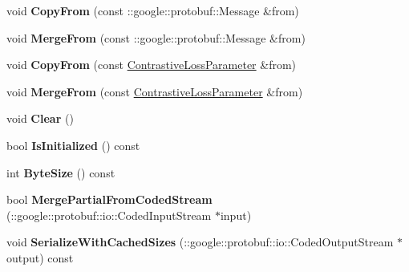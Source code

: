 \begin{DoxyCompactItemize}
void {\bfseries Copy\+From} (const \+::google\+::protobuf\+::\+Message \&from)
\item 
\mbox{\label{classcaffe_1_1_contrastive_loss_parameter_a8dff4d4f5ad416e1c0e89f91ada3deae}} 
void {\bfseries Merge\+From} (const \+::google\+::protobuf\+::\+Message \&from)
\item 
\mbox{\label{classcaffe_1_1_contrastive_loss_parameter_a97c49072d69a7b5a26083e0847d1804e}} 
void {\bfseries Copy\+From} (const \mbox{\hyperlink{classcaffe_1_1_contrastive_loss_parameter}{Contrastive\+Loss\+Parameter}} \&from)
\item 
\mbox{\label{classcaffe_1_1_contrastive_loss_parameter_a5e8d81975e8ff57eb9446bb814dfdc34}} 
void {\bfseries Merge\+From} (const \mbox{\hyperlink{classcaffe_1_1_contrastive_loss_parameter}{Contrastive\+Loss\+Parameter}} \&from)
\item 
\mbox{\label{classcaffe_1_1_contrastive_loss_parameter_a480e950024a2a5275e2cb4c9ef8e352a}} 
void {\bfseries Clear} ()
\item 
\mbox{\label{classcaffe_1_1_contrastive_loss_parameter_a5dbeecb7b6edf0be01a61d106b8d34e1}} 
bool {\bfseries Is\+Initialized} () const
\item 
\mbox{\label{classcaffe_1_1_contrastive_loss_parameter_a5f0a2c187f7129b71c2fa2215bf143d9}} 
int {\bfseries Byte\+Size} () const
\item 
\mbox{\label{classcaffe_1_1_contrastive_loss_parameter_ad5d641ff4f0579b8055a7c184f99838f}} 
bool {\bfseries Merge\+Partial\+From\+Coded\+Stream} (\+::google\+::protobuf\+::io\+::\+Coded\+Input\+Stream $\ast$input)
\item 
\mbox{\label{classcaffe_1_1_contrastive_loss_parameter_a65a4f3e96c52b8ec5540cc025f8a3f6a}} 
void {\bfseries Serialize\+With\+Cached\+Sizes} (\+::google\+::protobuf\+::io\+::\+Coded\+Output\+Stream $\ast$output) const

\end{DoxyCompactItemize}
